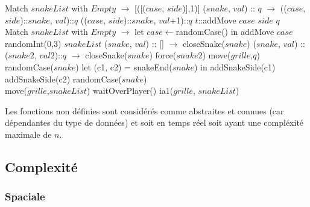 \documentclass[a4paper,12pt]{report}
\begin{document}
\begin{algorithmic}
	\State Match $snakeList$ with
	\State $Empty$ $\rightarrow$ [([($case$, $side$)],1)]
	\State ($snake$, $val$) :: $q$ $\rightarrow$
				\State (($case$, $side$)::$snake$, $val$)::$q$
			\Else
				\State (($case$, $side$)::$snake$, $val$+1)::$q$
			\EndIf
		\Else
			\State $t$::addMove $case$ $side$ $q$
		\EndIf
\EndFunction
\\
	\State Match $snakeList$ with
	\State $Empty$ $\rightarrow$ let $case\gets$randomCase() in addMove $case$ randomInt(0,3) $snakeList$
	\State ($snake$, $val$) :: [] $\rightarrow$
			\State closeSnake($snake$)
		\EndIf
	\State ($snake$, $val$) :: ($snake2$, $val2$)::$q$ $\rightarrow$
			\State closeSnake($snake$)
		\Else
				\State force($snake2$)
			\Else
				\State move($grille$,$q$)
			\EndIf
		\EndIf
\EndFunction
\\
		\State randomCase($snake$)
	\EndIf
	\State let (c1, c2) = snakeEnd($snake$) in
		\State addSnakeSide(c1)
	\Else
			\State addSnakeSide(c2)
			\Else randomCase($snake$)
		\EndIf
	\EndIf
\EndFunction
\\
	\State move($grille$,$snakeList$)
	\State waitOverPlayer()
	\State ia1($grille$, $snakeList$)
\EndFunction
\end{algorithmic}
Les fonctions non d\'efinies sont consid\'er\'es comme abstraites et connues (car d\'ependantes du type de donn\'ees) et soit en temps r\'eel soit ayant une compl\'exit\'e maximale de $n$. 

\subsection{Complexit\'e}

\subsubsection{Spaciale}
\end{document}
